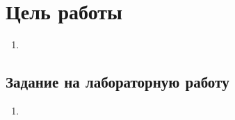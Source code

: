 \section*{Цель работы}

\begin{enumerate}
	\item 
\end{enumerate}

\subsection*{Задание на лабораторную работу}

\begin{enumerate}
	\item 
\end{enumerate}


\newpage



